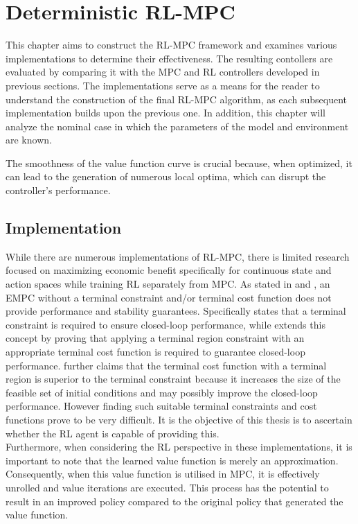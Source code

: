\chapter{Deterministic RL-MPC}
\label{chapter:deterministic_RL_MPC}

This chapter aims to construct the RL-MPC framework and examines various implementations to determine their effectiveness. The resulting contollers are evaluated by comparing it with the MPC and RL controllers developed in previous sections. The implementations serve as a means for the reader to understand the construction of the final RL-MPC algorithm, as each subsequent implementation builds upon the previous one. In addition, this chapter will analyze the nominal case in which the parameters of the model and environment are known. 

The smoothness of the value function curve is crucial because, when optimized, it can lead to the generation of numerous local optima, which can disrupt the controller's performance.


\section{Implementation} \label{section:rlmpc implementation}
While there are numerous implementations of RL-MPC, there is limited research focused on maximizing economic benefit specifically for continuous state and action spaces while training RL separately from MPC. As stated in \cite{ellisTutorialReviewEconomic2014} and \cite{amritEconomicOptimizationUsing2011}, an EMPC without a terminal constraint and/or terminal cost function does not provide performance and stability guarantees. Specifically \cite{ellisTutorialReviewEconomic2014} states that a terminal constraint is required to ensure closed-loop performance, while \cite{amritEconomicOptimizationUsing2011} extends this concept by proving that applying a terminal region constraint with an appropriate terminal cost function is required to guarantee closed-loop performance. \cite{amritEconomicOptimizationUsing2011} further claims that the terminal cost function with a terminal region is superior to the terminal constraint because it increases the size of the feasible set of initial conditions and may possibly improve the closed-loop performance. However finding such suitable terminal constraints and cost functions prove to be very difficult. It is the objective of this thesis is to ascertain whether the RL agent is capable of providing this.\\
Furthermore, when considering the RL perspective in these implementations, it is important to note that the learned value function is merely an approximation. Consequently, when this value function is utilised in MPC, it is effectively unrolled and value iterations are executed. This process has the potential to result in an improved policy compared to the original policy that generated the value function.


